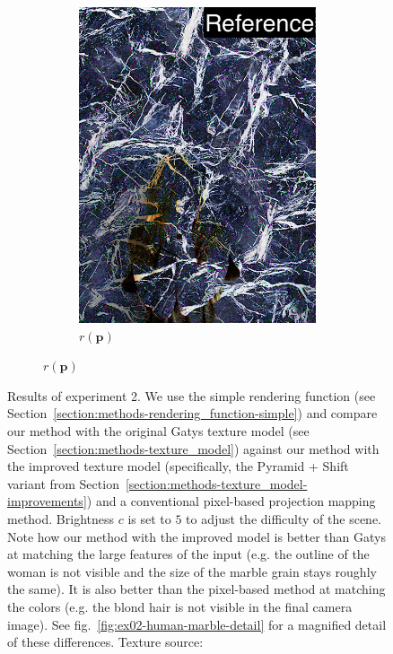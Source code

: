 \begin{figure}[]
\begin{subfigure}{\textwidth}
\begin{subfigure}{0.24\textwidth}
            \includegraphics[width=\textwidth]{images/04-experiment02/human/marble/pixel_proj_label.jpg}
            \caption*{\(r(\bm{p})\)}
        \end{subfigure}
    \end{subfigure}
    \caption{Results of experiment 2. We use the simple rendering function (see Section~\ref{section:methods-rendering_function-simple}) and compare our method with the original Gatys texture model (see Section~\ref{section:methods-texture_model}) against our method with the improved texture model (specifically, the Pyramid + Shift variant from Section~\ref{section:methods-texture_model-improvements}) and a conventional pixel-based projection mapping method. Brightness \(c\) is set to \(5\) to adjust the difficulty of the scene. Note how our method with the improved model is better than Gatys at matching the large features of the input (e.g. the outline of the woman is not visible and the size of the marble grain stays roughly the same). It is also better than the pixel-based method at matching the colors (e.g. the blond hair is not visible in the final camera image). See fig.~\ref{fig:ex02-human-marble-detail} for a magnified detail of these differences. Texture source: \citet{Pixar128}}
    \label{fig:ex02-human-marble}
\end{figure}

